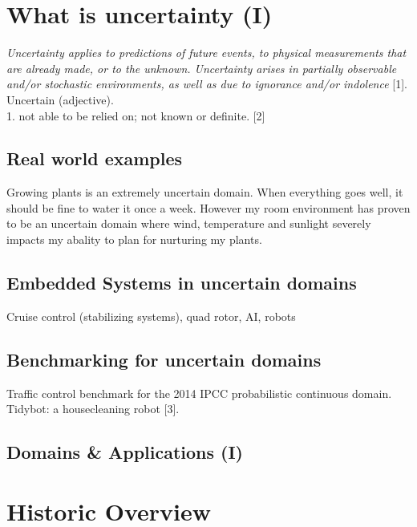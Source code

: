 \documentclass[runningheads,a4paper]{llncs}
\begin{document}
\section{What is uncertainty (I)}
\emph{Uncertainty applies to predictions of future events, to physical measurements that are already made, or to the unknown. Uncertainty arises in partially observable and/or stochastic environments, as well as due to ignorance and/or indolence} [1]. \\

Uncertain (adjective). \\
1. not able to be relied on; not known or definite. [2]

\subsection{Real world examples} 

Growing plants is an extremely uncertain domain. When everything goes well, it should be fine to water it once a week. However my room environment has proven to be an uncertain domain where wind, temperature and sunlight severely impacts my abality to plan for nurturing my plants. 

\subsection{Embedded Systems in uncertain domains}

Cruise control (stabilizing systems), quad rotor, AI, robots

\subsection{Benchmarking for uncertain domains}

Traffic control benchmark for the 2014 IPCC probabilistic continuous domain.
Tidybot: a housecleaning robot [3]. \\


\subsection{Domains \& Applications (I)}


\section{Historic Overview}
\end{document}
